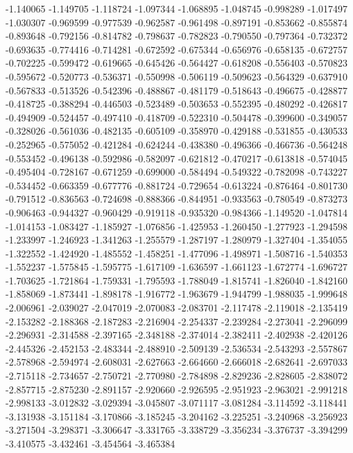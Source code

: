 -1.140065
-1.149705
-1.118724
-1.097344
-1.068895
-1.048745
-0.998289
-1.017497
-1.030307
-0.969599
-0.977539
-0.962587
-0.961498
-0.897191
-0.853662
-0.855874
-0.893648
-0.792156
-0.814782
-0.798637
-0.782823
-0.790550
-0.797364
-0.732372
-0.693635
-0.774416
-0.714281
-0.672592
-0.675344
-0.656976
-0.658135
-0.672757
-0.702225
-0.599472
-0.619665
-0.645426
-0.564427
-0.618208
-0.556403
-0.570823
-0.595672
-0.520773
-0.536371
-0.550998
-0.506119
-0.509623
-0.564329
-0.637910
-0.567833
-0.513526
-0.542396
-0.488867
-0.481179
-0.518643
-0.496675
-0.428877
-0.418725
-0.388294
-0.446503
-0.523489
-0.503653
-0.552395
-0.480292
-0.426817
-0.494909
-0.524457
-0.497410
-0.418709
-0.522310
-0.504478
-0.399600
-0.349057
-0.328026
-0.561036
-0.482135
-0.605109
-0.358970
-0.429188
-0.531855
-0.430533
-0.252965
-0.575052
-0.421284
-0.624244
-0.438380
-0.496366
-0.466736
-0.564248
-0.553452
-0.496138
-0.592986
-0.582097
-0.621812
-0.470217
-0.613818
-0.574045
-0.495404
-0.728167
-0.671259
-0.699000
-0.584494
-0.549322
-0.782098
-0.743227
-0.534452
-0.663359
-0.677776
-0.881724
-0.729654
-0.613224
-0.876464
-0.801730
-0.791512
-0.836563
-0.724698
-0.888366
-0.844951
-0.933563
-0.780549
-0.873273
-0.906463
-0.944327
-0.960429
-0.919118
-0.935320
-0.984366
-1.149520
-1.047814
-1.014153
-1.083427
-1.185927
-1.076856
-1.425953
-1.260450
-1.277923
-1.294598
-1.233997
-1.246923
-1.341263
-1.255579
-1.287197
-1.280979
-1.327404
-1.354055
-1.322552
-1.424920
-1.485552
-1.458251
-1.477096
-1.498971
-1.508716
-1.540353
-1.552237
-1.575845
-1.595775
-1.617109
-1.636597
-1.661123
-1.672774
-1.696727
-1.703625
-1.721864
-1.759331
-1.795593
-1.788049
-1.815741
-1.826040
-1.842160
-1.858069
-1.873441
-1.898178
-1.916772
-1.963679
-1.944799
-1.988035
-1.999648
-2.006961
-2.039027
-2.047019
-2.070083
-2.083701
-2.117478
-2.119018
-2.135419
-2.153282
-2.188368
-2.187283
-2.216904
-2.254337
-2.239284
-2.273041
-2.296099
-2.296931
-2.314588
-2.397165
-2.348188
-2.374014
-2.382411
-2.402938
-2.420126
-2.445326
-2.452153
-2.483344
-2.488910
-2.509139
-2.536534
-2.543293
-2.557867
-2.578968
-2.594974
-2.608031
-2.627663
-2.664660
-2.666018
-2.682641
-2.697033
-2.715118
-2.734657
-2.750721
-2.770980
-2.784898
-2.829236
-2.828605
-2.838072
-2.857715
-2.875230
-2.891157
-2.920660
-2.926595
-2.951923
-2.963021
-2.991218
-2.998133
-3.012832
-3.029394
-3.045807
-3.071117
-3.081284
-3.114592
-3.118441
-3.131938
-3.151184
-3.170866
-3.185245
-3.204162
-3.225251
-3.240968
-3.256923
-3.271504
-3.298371
-3.306647
-3.331765
-3.338729
-3.356234
-3.376737
-3.394299
-3.410575
-3.432461
-3.454564
-3.465384

